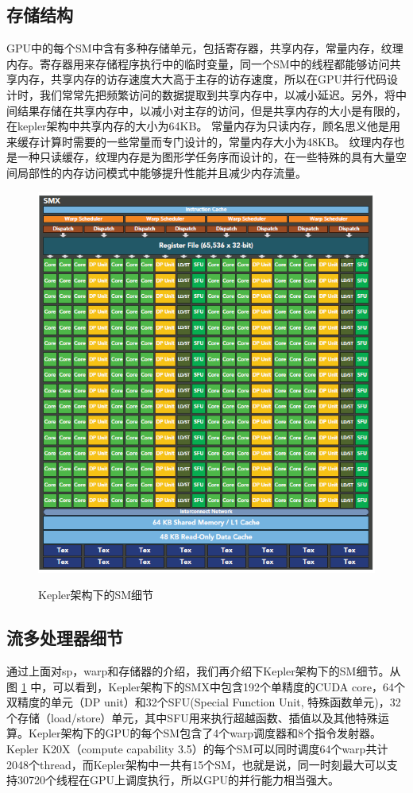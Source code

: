 \subsection{存储结构}
GPU中的每个SM中含有多种存储单元，包括寄存器，共享内存，常量内存，纹理内存。寄存器用来存储程序执行中的临时变量，同一个SM中的线程都能够访问共享内存，共享内存的访存速度大大高于主存的访存速度，所以在GPU并行代码设计时，我们常常先把频繁访问的数据提取到共享内存中，以减小延迟。另外，将中间结果存储在共享内存中，以减小对主存的访问，但是共享内存的大小是有限的，在kepler架构中共享内存的大小为64KB。
常量内存为只读内存，顾名思义他是用来缓存计算时需要的一些常量而专门设计的，常量内存大小为48KB。 纹理内存也是一种只读缓存，纹理内存是为图形学任务序而设计的，在一些特殊的具有大量空间局部性的内存访问模式中能够提升性能并且减少内存流量。
\begin{figure}
\setlength{\belowcaptionskip}{-0.5cm}
  \begin{center}
    {\includegraphics[width=1 \textwidth]{figures/smx.png}}
    \end{center}
  \caption{{\footnotesize{Kepler架构下的SM细节}}}
  \label{sm}
\end{figure}
\subsection{流多处理器细节}
通过上面对sp，warp和存储器的介绍，我们再介绍下Kepler架构下的SM细节。从图 \ref{sm} 中，可以看到，Kepler架构下的SMX中包含192个单精度的CUDA core，64个双精度的单元（DP unit）和32个SFU(Special Function Unit, 特殊函数单元)，32个存储（load/store）单元，其中SFU用来执行超越函数、插值以及其他特殊运算。Kepler架构下的GPU的每个SM包含了4个warp调度器和8个指令发射器。 Kepler K20X（compute capability 3.5）的每个SM可以同时调度64个warp共计2048个thread，而Kepler架构中一共有15个SM，也就是说，同一时刻最大可以支持30720个线程在GPU上调度执行，所以GPU的并行能力相当强大。

